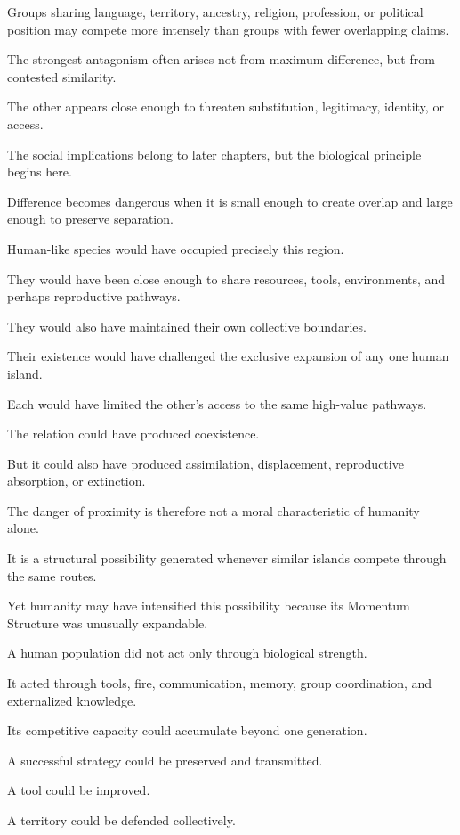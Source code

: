 Groups sharing language, territory, ancestry, religion, profession, or political position may compete more intensely than groups with fewer overlapping claims.

The strongest antagonism often arises not from maximum difference, but from contested similarity.

The other appears close enough to threaten substitution, legitimacy, identity, or access.

The social implications belong to later chapters, but the biological principle begins here.

Difference becomes dangerous when it is small enough to create overlap and large enough to preserve separation.

Human-like species would have occupied precisely this region.

They would have been close enough to share resources, tools, environments, and perhaps reproductive pathways.

They would also have maintained their own collective boundaries.

Their existence would have challenged the exclusive expansion of any one human island.

Each would have limited the other’s access to the same high-value pathways.

The relation could have produced coexistence.

But it could also have produced assimilation, displacement, reproductive absorption, or extinction.

The danger of proximity is therefore not a moral characteristic of humanity alone.

It is a structural possibility generated whenever similar islands compete through the same routes.

Yet humanity may have intensified this possibility because its Momentum Structure was unusually expandable.

A human population did not act only through biological strength.

It acted through tools, fire, communication, memory, group coordination, and externalized knowledge.

Its competitive capacity could accumulate beyond one generation.

A successful strategy could be preserved and transmitted.

A tool could be improved.

A territory could be defended collectively.

